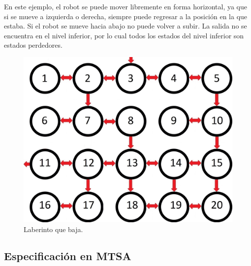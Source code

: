 En este ejemplo, el robot se puede mover libremente en forma horizontal, ya que si se mueve a izquierda o derecha, siempre puede regresar a la posición en la que estaba. 
Si el robot se mueve hacia abajo no puede volver a subir. La salida no se encuentra en el nivel inferior, por lo cual todos los estados del nivel inferior son estados perdedores.

\begin{figure}[H]
	\centering
		\includegraphics[scale=0.2]{Imagenes/Laberintos/Down.jpg}
	\caption{Laberinto que baja.}
	\label{fig:down}
\end{figure}

\subsection{Especificación en MTSA}


